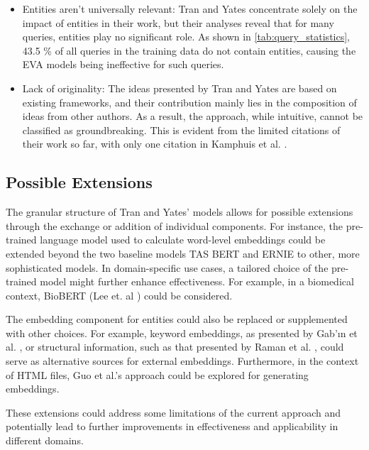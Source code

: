 \begin{itemize}
\item Entities aren't universally relevant: Tran and Yates concentrate solely on the impact of entities in their work, but their analyses reveal that for many queries, entities play no significant role. As shown in \autoref{tab:query_statistics}, 43.5 \% of all queries in the training data do not contain entities, causing the EVA models being ineffective for such queries.
\item Lack of originality: The ideas presented by Tran and Yates are based on existing frameworks, and their contribution mainly lies in the composition of ideas from other authors. As a result, the approach, while intuitive, cannot be classified as groundbreaking. This is evident from the limited citations of their work so far, with only one citation in Kamphuis et al. \cite{kamphuis2023mmead}.
\end{itemize}

\subsection{Possible Extensions}
The granular structure of Tran and Yates' models allows for possible extensions through the exchange or addition of individual components. For instance, the pre-trained language model used to calculate word-level embeddings could be extended beyond the two baseline models TAS BERT and ERNIE to other, more sophisticated models. In domain-specific use cases, a tailored choice of the pre-trained model might further enhance effectiveness. For example, in a biomedical context, BioBERT (Lee et. al \cite{lee2020biobert}) could be considered.

The embedding component for entities could also be replaced or supplemented with other choices. For example, keyword embeddings, as presented by Gab{'\i}n et al. \cite{gabin2023keyword}, or structural information, such as that presented by Raman et al. \cite{raman2022structure}, could serve as alternative sources for external embeddings. Furthermore, in the context of HTML files, Guo et al.'s approach \cite{guo2022webformer} could be explored for generating embeddings.

These extensions could address some limitations of the current approach and potentially lead to further improvements in effectiveness and applicability in different domains.




